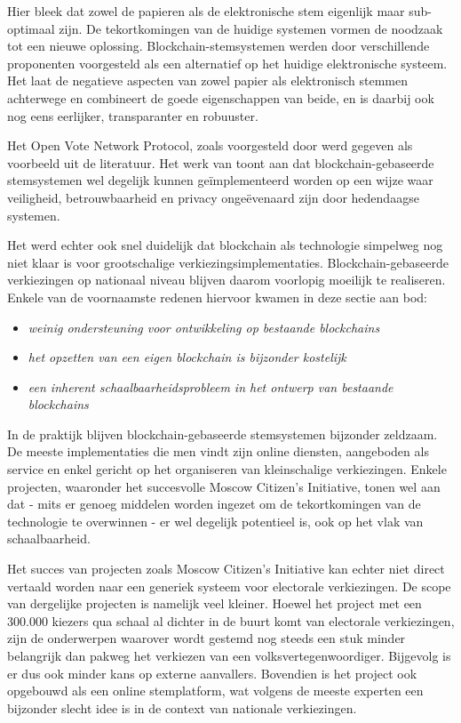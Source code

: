 	Hier bleek dat zowel de papieren als de elektronische stem eigenlijk maar sub-optimaal zijn. De tekortkomingen van de huidige systemen vormen de noodzaak tot een nieuwe oplossing. Blockchain-stemsystemen werden door verschillende proponenten voorgesteld als een alternatief op het huidige elektronische systeem. Het laat de negatieve aspecten van zowel papier als elektronisch stemmen achterwege en combineert de goede eigenschappen van beide,  en is daarbij ook nog eens eerlijker, transparanter en robuuster.
	
	Het Open Vote Network Protocol, zoals voorgesteld door \textcite{McCorry2017} werd gegeven als voorbeeld uit de literatuur. Het werk van \textcite{McCorry2017} toont aan dat blockchain-gebaseerde stemsystemen wel degelijk kunnen geïmplementeerd worden op een wijze waar veiligheid, betrouwbaarheid en privacy ongeëvenaard zijn door hedendaagse systemen.
	
	Het werd echter ook snel duidelijk dat blockchain als technologie simpelweg nog niet klaar is voor grootschalige verkiezingsimplementaties. Blockchain-gebaseerde verkiezingen op nationaal niveau blijven daarom voorlopig moeilijk te realiseren.  Enkele van de voornaamste redenen hiervoor kwamen in deze sectie aan bod:
	\begin{itemize}
		\item\textit{weinig ondersteuning voor ontwikkeling op bestaande blockchains}
		\item\textit{het opzetten van een eigen blockchain is bijzonder kostelijk}
		\item\textit{een inherent schaalbaarheidsprobleem in het ontwerp van bestaande blockchains}
	\end{itemize}
	In de praktijk blijven blockchain-gebaseerde stemsystemen bijzonder zeldzaam. De meeste implementaties die men vindt zijn online diensten, aangeboden als service en enkel gericht op het organiseren van kleinschalige verkiezingen. Enkele projecten, waaronder het succesvolle Moscow Citizen's Initiative, tonen wel aan dat - mits er  genoeg middelen worden ingezet om de tekortkomingen van de technologie te overwinnen - er wel degelijk potentieel is, ook op het vlak van schaalbaarheid.
	
	Het succes van projecten zoals Moscow Citizen's Initiative kan echter niet direct vertaald worden naar een generiek systeem voor electorale verkiezingen. De scope van dergelijke projecten is namelijk veel kleiner. Hoewel het project met een 300.000 kiezers qua schaal al dichter in de buurt komt van electorale verkiezingen, zijn de onderwerpen waarover wordt gestemd nog steeds een stuk minder belangrijk dan pakweg het verkiezen van een volksvertegenwoordiger. Bijgevolg is er dus ook minder kans op externe aanvallers. Bovendien is het project ook opgebouwd als een online stemplatform, wat volgens de meeste experten een bijzonder slecht idee is in de context van nationale verkiezingen.
	
